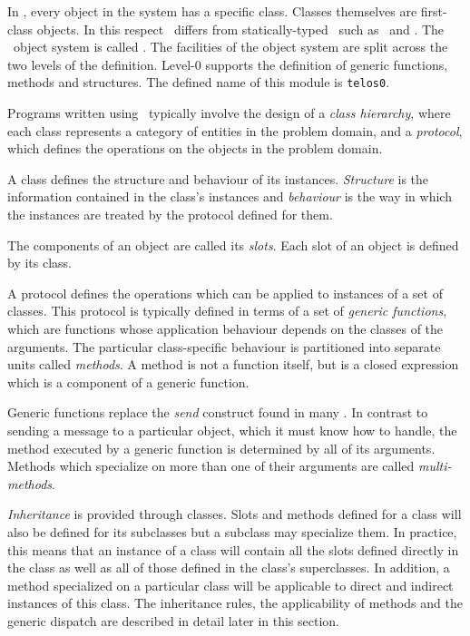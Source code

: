 \begin{optDefinition}
\noindent
In \eulisp, every object in the system has a specific class.  Classes themselves
are first-class objects.  In this respect \eulisp\ differs from statically-typed
\ools\ such as \Cpp\ and \mceyx.  The \eulisp\ object system is called \telos.
The facilities of the object system are split across the two levels of the
definition.  Level-0 supports the definition of generic functions, methods and
structures.  The defined name of this module is {\tt telos0}.

Programs written using \telos\ typically involve the design of a {\em class
    hierarchy}, where each class represents a category of entities in the
problem domain, and a {\em protocol}, which defines the operations on the
objects in the problem domain.

A class defines the structure and behaviour of its instances.  {\em Structure\/}
is the information contained in the class's instances and {\em behaviour\/} is
the way in which the instances are treated by the protocol defined for them.

The components of an object are called its {\em slots}. Each slot of an object
is defined by its class.

A protocol defines the operations which can be applied to instances of a set of
classes.  This protocol is typically defined in terms of a set of {\em generic
    functions}, which are functions whose application behaviour depends on the
classes of the arguments.  The particular class-specific behaviour is
partitioned into separate units called {\em methods}. A method is not a function
itself, but is a closed expression which is a component of a generic function.

Generic functions replace the {\em send} construct found in many \ools.  In
contrast to sending a message to a particular object, which it must know how to
handle, the method executed by a generic function is determined by all of its
arguments.  Methods which specialize on more than one of their arguments are
called {\em multi-methods}.

{\em Inheritance} is provided through classes. Slots and methods defined for a
class will also be defined for its subclasses but a subclass may specialize
them. In practice, this means that an instance of a class will contain all the
slots defined directly in the class as well as all of those defined in the
class's superclasses. In addition, a method specialized on a particular class
will be applicable to direct and indirect instances of this class.  The
inheritance rules, the applicability of methods and the generic dispatch are
described in detail later in this section.


\end{optDefinition}
